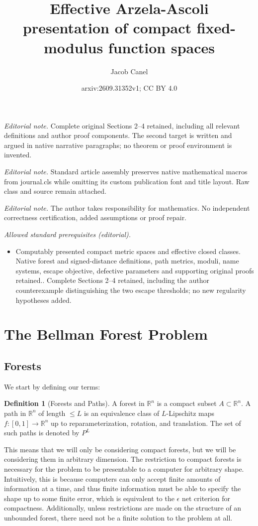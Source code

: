 \documentclass[10pt,a4paper]{article}
\title{Effective Arzela-Ascoli presentation of compact fixed-modulus function spaces}
\author{Jacob Canel}
\date{arxiv:2609.31352v1; CC BY 4.0}
\theoremstyle{definition}
\newtheorem{dfn}[thm]{Definition}
\def\R{\mathbb{R}}
\begin{document}
\maketitle
\noindent\textit{Editorial note.} Complete original Sections 2--4 retained, including all relevant definitions and author proof components. The second target is written and argued in native narrative paragraphs; no theorem or proof environment is invented.\par\medskip
\noindent\textit{Editorial note.} Standard article assembly preserves native mathematical macros from journal.cls while omitting its custom publication font and title layout. Raw class and source remain attached.\par\medskip
\noindent\textit{Editorial note.} The author takes responsibility for mathematics. No independent correctness certification, added assumptions or proof repair.\par\medskip
\noindent\textit{Allowed standard prerequisites (editorial).}\begin{itemize}
\item Computably presented compact metric spaces and effective closed classes. Native forest and signed-distance definitions, path metrics, moduli, name systems, escape objective, defective parameters and supporting original proofs retained.. Complete Sections 2--4 retained, including the author counterexample distinguishing the two escape thresholds; no new regularity hypotheses added.
\end{itemize}\medskip
\section{The Bellman Forest Problem}
\label{sec:two}
\subsection{Forests}
\label{sec:forests}
We start by defining our terms:
\begin{dfn}[Forests and Paths]
A forest in $\R^n$ is a compact subset $A\subset\R^n$. A path in $\R^n$ of length $\leq L$ is an equivalence class of $L$-Lipschitz maps $f:[0,1]\rightarrow \R^n$ up to reparameterization, rotation, and translation. The set of such paths is denoted by $P^L$
\end{dfn}
\label{dfn:forpath}
This means that we will only be considering compact forests, but we will be considering them in arbitrary dimension. The restriction to compact forests is necessary for the problem to be presentable to a computer for arbitrary shape. Intuitively, this is because computers can only accept finite amounts of information at a time, and thus finite information must be able to specify the shape up to some finite error, which is equivalent to the $\epsilon$ net criterion for compactness. Additionally, unless restrictions are made on the structure of an unbounded forest, there need not be a finite solution to the problem at all. 
\end{document}
